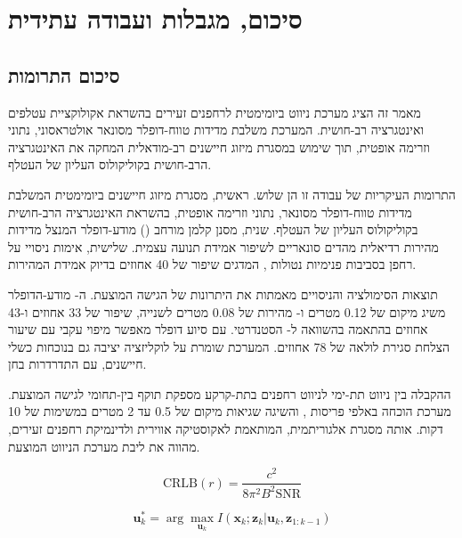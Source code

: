 

\section{סיכום, מגבלות ועבודה עתידית}
\label{sec:ch09_conclusion}

\subsection{סיכום התרומות}
\label{sec:ch09_summary}

מאמר זה הציג מערכת ניווט ביומימטית לרחפנים זעירים בהשראת אקולוקציית עטלפים ואינטגרציה רב-חושית. המערכת משלבת מדידות טווח-דופלר מסונאר אולטראסוני, נתוני  וזרימה אופטית, תוך שימוש במסגרת מיזוג חיישנים רב-מודאלית המחקה את האינטגרציה הרב-חושית בקוליקולוס העליון של העטלף.

התרומות העיקריות של עבודה זו הן שלוש. ראשית, מסגרת מיזוג חיישנים ביומימטית המשלבת מדידות טווח-דופלר מסונאר, נתוני  וזרימה אופטית, בהשראת האינטגרציה הרב-חושית בקוליקולוס העליון של העטלף. שנית, מסנן קלמן מורחב () מודע-דופלר המנצל מדידות מהירות רדיאלית מהדים סונאריים לשיפור אמידת תנועה עצמית. שלישית, אימות ניסויי על רחפן  בסביבות פנימיות נטולות , המדגים שיפור של 40 אחוזים בדיוק אמידת המהירות.

תוצאות הסימולציה והניסויים מאמתות את היתרונות של הגישה המוצעת. ה- מודע-הדופלר משיג  מיקום של 0.12 מטרים ו- מהירות של 0.08 מטרים לשנייה, שיפור של 33 אחוזים ו-43 אחוזים בהתאמה בהשוואה ל- הסטנדרטי.  עם סיוע דופלר מאפשר מיפוי עקבי עם שיעור הצלחת סגירת לולאה של 78 אחוזים. המערכת שומרת על לוקליזציה יציבה גם בנוכחות כשלי חיישנים, עם התדרדרות בחן.

ההקבלה בין ניווט תת-ימי לניווט רחפנים בתת-קרקע מספקת תוקף בין-תחומי לגישה המוצעת. מערכת  הוכחה באלפי פריסות , והשיגה שגיאות מיקום של 0.5 עד 2 מטרים במשימות של 10 דקות. אותה מסגרת אלגוריתמית, המותאמת לאקוסטיקה אווירית ולדינמיקת רחפנים זעירים, מהווה את ליבת מערכת הניווט המוצעת.

\begin{equation}
\text{CRLB}(r) = \frac{c^2}{8 \pi^2 B^2 \text{SNR}}
\label{eq:ch09_crlb}
\end{equation}

\begin{equation}
\mathbf{u}_k^* = \arg\max_{\mathbf{u}_k} I(\mathbf{x}_k; \mathbf{z}_k | \mathbf{u}_k, \mathbf{z}_{1:k-1})
\label{eq:ch09_sensor_scheduling}
\end{equation}


